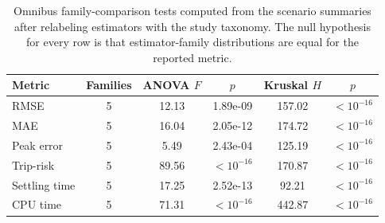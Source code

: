 \begin{table}[t]
\centering
\caption{Omnibus family-comparison tests computed from the scenario summaries after relabeling estimators with the study taxonomy. The null hypothesis for every row is that estimator-family distributions are equal for the reported metric.}
\label{tab:auto_hypotheses}
\scriptsize
\setlength{\tabcolsep}{3.5pt}
\renewcommand{\arraystretch}{1.1}
\begin{tabular}{l c c c c c}
\toprule
Metric & Families & ANOVA $F$ & $p$ & Kruskal $H$ & $p$ \\
\midrule
RMSE & 5 & 12.13 & 1.89e-09 & 157.02 & $<10^{-16}$ \\
MAE & 5 & 16.04 & 2.05e-12 & 174.72 & $<10^{-16}$ \\
Peak error & 5 & 5.49 & 2.43e-04 & 125.19 & $<10^{-16}$ \\
Trip-risk & 5 & 89.56 & $<10^{-16}$ & 170.87 & $<10^{-16}$ \\
Settling time & 5 & 17.25 & 2.52e-13 & 92.21 & $<10^{-16}$ \\
CPU time & 5 & 71.31 & $<10^{-16}$ & 442.87 & $<10^{-16}$ \\
\bottomrule
\end{tabular}
\end{table}
